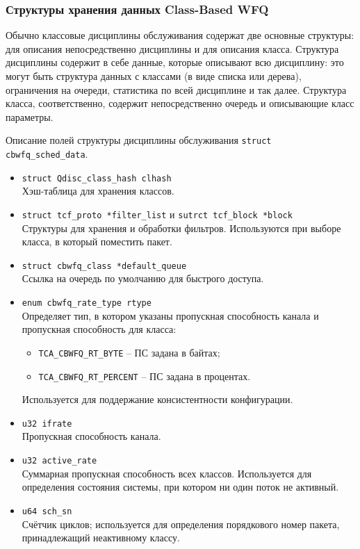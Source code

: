 		\subsubsection{Структуры хранения данных Class-Based WFQ}
	
			Обычно классовые дисциплины обслуживания содержат две основные структуры:
			для описания непосредственно дисциплины и для описания класса.  
			Структура дисциплины содержит в себе данные, которые описывают всю дисциплину:
			это могут быть структура данных с классами (в виде списка или дерева),
			ограничения на очереди, статистика по всей дисциплине и так далее.
			Структура класса, соответственно, содержит непосредственно очередь и описывающие
			класс параметры.

			Описание полей структуры дисциплины обслуживания \lstinline{struct cbwfq_sched_data}.
			\begin{itemize}
				\item \lstinline{struct Qdisc_class_hash clhash} \\
					Хэш-таблица для хранения классов. 
				\item \lstinline{struct tcf_proto *filter_list} и \lstinline{sutrct tcf_block *block}\\
					Структуры для хранения и обработки фильтров. Используются при выборе
					класса, в который поместить пакет.
				\item \lstinline{struct cbwfq_class *default_queue}\\
					Ссылка на очередь по умолчанию для быстрого доступа. 
				\item \lstinline{enum cbwfq_rate_type rtype}\\
					Определяет тип, в котором указаны пропускная способность канала
					и пропускная способность для класса:
					\begin{itemize}
						\item \lstinline{TCA_CBWFQ_RT_BYTE} -- ПС задана в байтах;
						\item \lstinline{TCA_CBWFQ_RT_PERCENT} -- ПС задана в процентах.
					\end{itemize}
					Используется для поддержание консистентности конфигурации.
				\item \lstinline{u32 ifrate} \\
					Пропускная способность канала. 
				\item \lstinline{u32 active_rate} \\
					Суммарная пропускная способность всех классов. Используется
					для определения состояния системы, при котором ни один поток не активный.
				\item \lstinline{u64 sch_sn} \\
					Счётчик циклов; используется для определения порядкового
					номер пакета, принадлежащий неактивному классу.
			\end{itemize}


